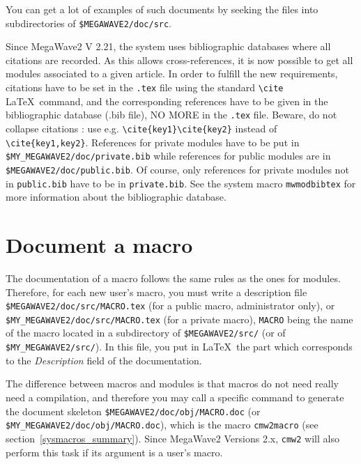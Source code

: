 You can get a lot of examples of such documents by seeking the files into
subdirectories of \verb+$MEGAWAVE2/doc/src+.

Since MegaWave2 V 2.21, the system uses bibliographic databases where all citations
are recorded. As this allows cross-references, it is now possible to get all modules associated to
a given article. In order to fulfill the new requirements, citations have to be set
in the \verb+.tex+ file using the standard \verb+\cite+ \LaTeX\ command,
and the corresponding references have to be given in the bibliographic database (.bib file), NO MORE in the \verb+.tex+ file.
Beware, do not collapse citations : use e.g. \verb+\cite{key1}\cite{key2}+ instead of \verb+\cite{key1,key2}+.
References for private modules have to be put in \verb+$MY_MEGAWAVE2/doc/private.bib+
while references for public modules are in \verb+$MEGAWAVE2/doc/public.bib+.
Of course, only references for private modules not in \verb+public.bib+ have to be in \verb+private.bib+.
See the system macro {\tt mwmodbibtex} for more information about the bibliographic database.


\section{Document a macro}
\label{document_macro}

The documentation of a macro follows the same rules as the ones for modules.
Therefore, for each new user's macro, you must write a description file 
\verb+$MEGAWAVE2/doc/src/MACRO.tex+ (for a public macro, administrator only), or 
\verb+$MY_MEGAWAVE2/doc/src/MACRO.tex+ (for a private macro), \verb+MACRO+ being 
the name of the macro located in a subdirectory of \verb+$MEGAWAVE2/src/+ (or of
\verb+$MY_MEGAWAVE2/src/+).
In this file, you put in \LaTeX\ the part which corresponds to the {\em Description} field of 
the documentation.

The difference between macros and modules is that macros do not need really need a compilation,
and therefore you may call a specific command to generate the document skeleton 
\newline
\verb+$MEGAWAVE2/doc/obj/MACRO.doc+ (or \verb+$MY_MEGAWAVE2/doc/obj/MACRO.doc+),
which is the macro \verb+cmw2macro+ (see section~\ref{sysmacros_summary}).
Since MegaWave2 Versions 2.x, \verb+cmw2+ will also perform this task if its argument
is a user's macro.

